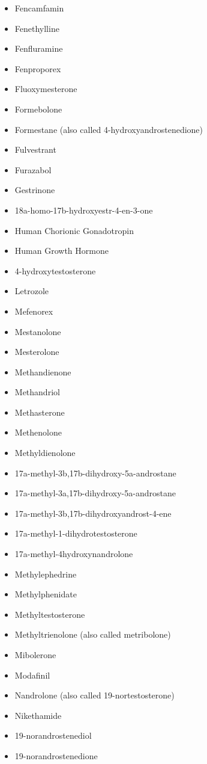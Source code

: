 \documentclass[
]{book}
\begin{document}
\begin{itemize}
\item
  Fencamfamin
\item
  Fenethylline
\item
  Fenfluramine
\item
  Fenproporex
\item
  Fluoxymesterone
\item
  Formebolone
\item
  Formestane (also called 4-hydroxyandrostenedione)
\item
  Fulvestrant
\item
  Furazabol
\item
  Gestrinone
\item
  18a-homo-17b-hydroxyestr-4-en-3-one
\item
  Human Chorionic Gonadotropin
\item
  Human Growth Hormone
\item
  4-hydroxytestosterone
\item
  Letrozole
\item
  Mefenorex
\item
  Mestanolone
\item
  Mesterolone
\item
  Methandienone
\item
  Methandriol
\item
  Methasterone
\item
  Methenolone
\item
  Methyldienolone
\item
  17a-methyl-3b,17b-dihydroxy-5a-androstane
\item
  17a-methyl-3a,17b-dihydroxy-5a-androstane
\item
  17a-methyl-3b,17b-dihydroxyandrost-4-ene
\item
  17a-methyl-1-dihydrotestosterone
\item
  17a-methyl-4hydroxynandrolone
\item
  Methylephedrine
\item
  Methylphenidate
\item
  Methyltestosterone
\item
  Methyltrienolone (also called metribolone)
\item
  Mibolerone
\item
  Modafinil
\item
  Nandrolone (also called 19-nortestosterone)
\item
  Nikethamide
\item
  19-norandrostenediol
\item
  19-norandrostenedione

\end{itemize}
\end{document}
